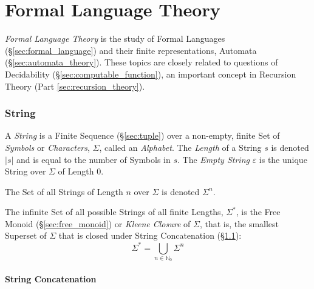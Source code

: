 \part{Formal Language Theory}\label{sec:formal_language_theory}
\cite{hammel03}

\emph{Formal Language Theory} is the study of Formal Languages
(\S\ref{sec:formal_language}) and their finite representations,
Automata (\S\ref{sec:automata_theory}). These topics are closely
related to questions of Decidability
(\S\ref{sec:computable_function}), an important concept in Recursion
Theory (Part \ref{sec:recursion_theory}).



\section{String}\label{sec:string}

A \emph{String} is a Finite Sequence (\S\ref{sec:tuple}) over a
non-empty, finite Set of \emph{Symbols} or \emph{Characters},
$\Sigma$, called an \emph{Alphabet}. The \emph{Length} of a String $s$
is denoted $|s|$ and is equal to the number of Symbols in $s$. The
\emph{Empty String} $\varepsilon$ is the unique String over $\Sigma$
of Length 0.

The Set of all Strings of Length $n$ over $\Sigma$ is denoted
$\Sigma^n$.

The infinite Set of all possible Strings of all finite Lengths,
$\Sigma^*$, is the Free Monoid (\S\ref{sec:free_monoid}) or
\emph{Kleene Closure} of $\Sigma$, that is, the smallest Superset of
$\Sigma$ that is closed under String Concatenation
(\S\ref{sec:string_concatenation}):
\[
    \Sigma^* = \bigcup_{n\in\mathbb{N}_0} \Sigma^n
\]



\subsection{String Concatenation}\label{sec:string_concatenation}


